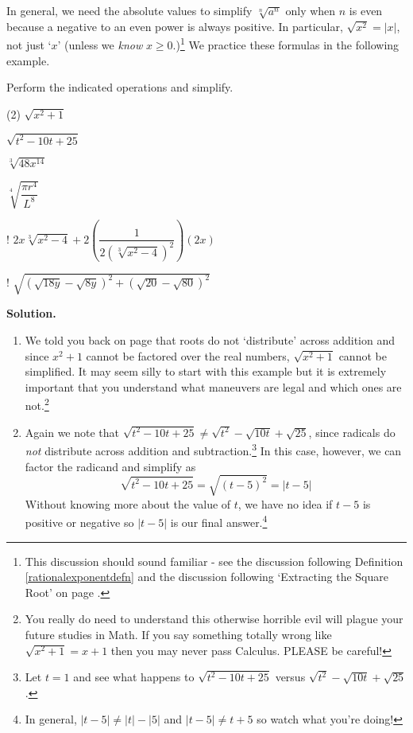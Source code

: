 In general, we need the absolute values to simplify $\sqrt[n]{a^{n}}$ only when $n$ is even because a negative to an even power is always positive.  In particular, $\sqrt{x^2} = |x|$, not just `$x$' (unless we \textit{know} $x \geq 0$.)\footnote{This discussion should sound familiar - see the discussion following Definition \ref{rationalexponentdefn} and the discussion following `Extracting the Square Root' on page \pageref{extractingthesquareroot}.}  We practice these formulas in the following example.

\begin{ex}\label{simplifyradexpressions}  Perform the indicated operations and simplify.

\begin{tasks}(2)
\task  $\sqrt{x^{2} + 1}$

\task  $\sqrt{t^2-10t+25}$

\task  $\sqrt[3]{48x^{14}}$

\task  $\sqrt[4]{\dfrac{\pi r^{4}}{L^{8}}}$

\task! $2x \sqrt[3]{x^2-4} + 2\left(\dfrac{1}{2(\sqrt[3]{x^2-4})^2}\right)  (2x)$ 

\task!  $\sqrt{(\sqrt{18y} - \sqrt{8y})^2 + (\sqrt{20} - \sqrt{80})^2}$ 

\end{tasks}

{\bf Solution.}

\begin{enumerate}

\item We told you back on page \pageref{donotdistributeexponents} that roots do not `distribute' across addition and since $x^{2} + 1$ cannot be factored over the real numbers, $\sqrt{x^{2} + 1}$ cannot be simplified.  It may seem silly to start with this example but it is extremely important that you understand what maneuvers are legal and which ones are not.\footnote{You really do need to understand this otherwise horrible evil will plague your future studies in Math.  If you say something totally wrong like $\sqrt{x^{2} + 1} = x + 1$ then you may never pass Calculus.  PLEASE be careful!}

\item Again we note that $\sqrt{t^2-10t+25}  \neq \sqrt{t^2} - \sqrt{10t} + \sqrt{25}$, since radicals do \textit{not} distribute across addition and subtraction.\footnote{Let $t = 1$ and see what happens to $\sqrt{t^2-10t+25}$  versus $\sqrt{t^2} - \sqrt{10t} + \sqrt{25}$.}  In this case, however, we can factor the radicand and simplify as \[ \sqrt{t^2 - 10t + 25} = \sqrt{(t-5)^2} = |t-5| \]
Without knowing more about the value of $t$, we have no idea if $t-5$ is positive or negative so $|t-5|$ is our final answer.\footnote{In general,  $|t-5| \neq |t| - |5|$ and  $|t-5| \neq t + 5$ so watch what you're doing!}


\end{enumerate}
\end{ex}
